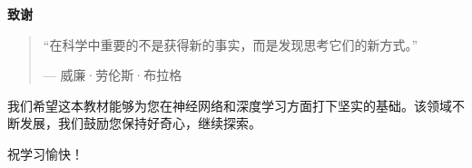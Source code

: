 % 

\newpage
\thispagestyle{empty}

\vspace*{3cm}

\begin{center}
    \Large\textbf{致谢}
\end{center}

\vspace{2cm}

\begin{quotation}
    ``在科学中重要的不是获得新的事实，而是发现思考它们的新方式。''

    \vspace{1cm}

    --- 威廉·劳伦斯·布拉格
\end{quotation}

\vspace{3cm}

我们希望这本教材能够为您在神经网络和深度学习方面打下坚实的基础。该领域不断发展，我们鼓励您保持好奇心，继续探索。

祝学习愉快！

\newpage
